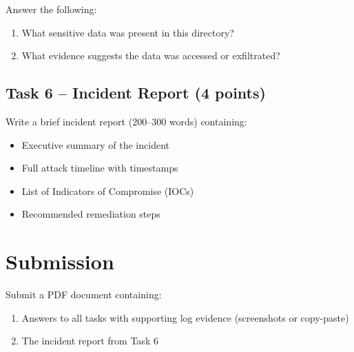 \documentclass[a4paper, 12pt]{article}
\begin{document}
Answer the following:
\begin{enumerate}[label=\alph*)]
    \item What sensitive data was present in this directory?
    \item What evidence suggests the data was accessed or exfiltrated?
\end{enumerate}

\subsection{Task 6 -- Incident Report (4 points)}

Write a brief incident report (200--300 words) containing:
\begin{itemize}
    \item Executive summary of the incident
    \item Full attack timeline with timestamps
    \item List of Indicators of Compromise (IOCs)
    \item Recommended remediation steps
\end{itemize}

\section{Submission}

Submit a PDF document containing:
\begin{enumerate}
    \item Answers to all tasks with supporting log evidence (screenshots or copy-paste)
    \item The incident report from Task 6
\end{enumerate}
\end{document}
